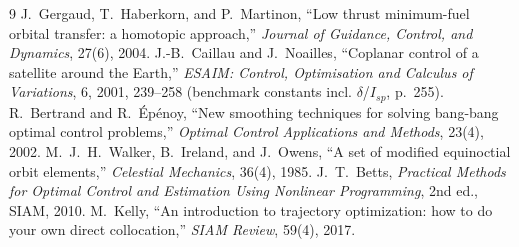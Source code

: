\documentclass[11pt]{article}
\begin{document}
\begin{thebibliography}{9}
 J.~Gergaud, T.~Haberkorn, and P.~Martinon,
``Low thrust minimum-fuel orbital transfer: a homotopic approach,''
\emph{Journal of Guidance, Control, and Dynamics}, 27(6), 2004.
 J.-B.~Caillau and J.~Noailles,
``Coplanar control of a satellite around the Earth,''
\emph{ESAIM: Control, Optimisation and Calculus of Variations}, 6, 2001, 239--258
(benchmark constants incl. $\delta$/$I_{sp}$, p.~255).
 R.~Bertrand and R.~\'Ep\'enoy,
``New smoothing techniques for solving bang-bang optimal control problems,''
\emph{Optimal Control Applications and Methods}, 23(4), 2002.
 M.~J.~H.~Walker, B.~Ireland, and J.~Owens,
``A set of modified equinoctial orbit elements,''
\emph{Celestial Mechanics}, 36(4), 1985.
 J.~T.~Betts, \emph{Practical Methods for Optimal Control and
Estimation Using Nonlinear Programming}, 2nd ed., SIAM, 2010.
 M.~Kelly, ``An introduction to trajectory optimization: how
to do your own direct collocation,'' \emph{SIAM Review}, 59(4), 2017.
\end{thebibliography}
\end{document}
